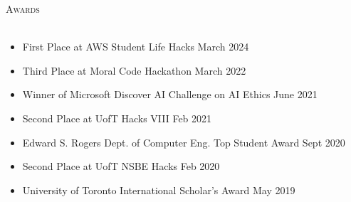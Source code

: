 \documentclass[a4paper]{article}
\newcommand{\lineunder} {
    \vspace*{-8pt} \\
    \hspace*{-18pt} \hrulefill \\
}
\newcommand{\header} [1] {
    {\hspace*{-18pt}\vspace*{6pt} \textsc{#1}}
    \vspace*{-6pt} \lineunder
}
\begin{document}
\header{Awards}
\vspace{-3mm}
\begin{itemize} \itemsep 0.5pt
	\item \begin{small} First Place at AWS Student Life Hacks \hfill March 2024 \end{small}
	\vspace{-2mm}
    \item \begin{small} Third Place at Moral Code Hackathon \hfill March 2022 \end{small}
	\vspace{-2mm}
    \item \begin{small} Winner of Microsoft Discover AI Challenge on AI Ethics \hfill June 2021 \end{small}
	\vspace{-2mm}
    \item \begin{small} Second Place at UofT Hacks VIII \hfill Feb 2021 \end{small}
    \vspace{-2mm}
    \item \begin{small} Edward S. Rogers Dept. of Computer Eng. Top Student Award \hfill Sept 2020 \end{small}
    \vspace{-2mm}
    \item \begin{small} Second Place at UofT NSBE Hacks \hfill Feb 2020 \end{small}
    \vspace{-2mm}
    \item \begin{small} University of Toronto International Scholar’s Award \hfill May 2019 \end{small}
    \vspace{-2mm}
\end{itemize}
\end{document}
